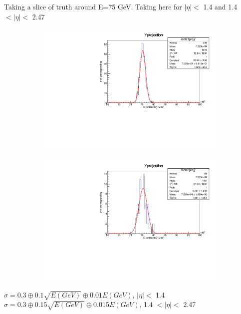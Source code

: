 \documentclass[•]{beamer}
\theoremstyle{remark}
\begin{document}
\begin{frame}[shrink=20]
\begin{block}
Taking a slice of truth around E=75 GeV. 
Taking here for $|\eta|<$ 1.4 and 1.4 $<|\eta|<$ 2.47 
\end{block}
\begin{figure}[tbp]
\centering
\begin{subfigure}[b]{0.4\textwidth}
\includegraphics[width=\textwidth]{Figforpres/eleta1fill.pdf}
\end{subfigure}
\begin{subfigure}[b]{0.4\textwidth}
\includegraphics[width=\textwidth]{Figforpres/eleta2fill.pdf}
\end{subfigure}
\end{figure}
\begin{block}

$\sigma=0.3\oplus 0.1\sqrt{E(GeV)}\oplus 0.01E(GeV)$, $|\eta|<$ 1.4
$\sigma=0.3\oplus 0.15\sqrt{E(GeV)}\oplus 0.015E(GeV)$, 1.4 $<|\eta|<$ 2.47 
\end{block}
\end{frame}
\end{document}
